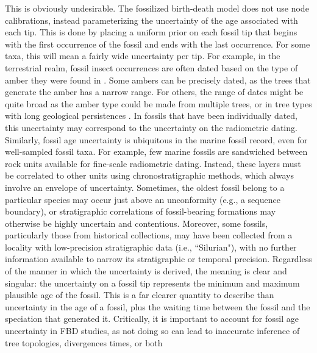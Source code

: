 \documentclass{article}
\begin{document}
This is obviously undesirable.
The fossilized birth-death model does not use node calibrations, instead parameterizing the uncertainty of the age associated with each tip.
This is done by placing a uniform prior on each fossil tip that begins with the first occurrence of the fossil and ends with the last occurrence. 
For some taxa, this will mean a fairly wide uncertainty per tip.
For example, in the terrestrial realm, fossil insect occurrences are often dated based on the type of amber they were found in \citep{lapolla2013}. Some ambers can be precisely dated, as the trees that generate the amber has a narrow range.
For others, the range of dates might be quite broad as the amber type could be made from multiple trees, or in tree types with long geological persistences \citep{poinar2000}. In fossils that have been individually dated, this uncertainty may correspond to the uncertainty on the radiometric dating. Similarly, fossil age uncertainty is ubiquitous in the marine fossil record, even for well-sampled fossil taxa. For example, few marine fossils are sandwiched between rock units available for fine-scale radiometric dating. Instead, these layers must be correlated to other units using chronostratigraphic methods, which always involve an envelope of uncertainty. Sometimes, the oldest fossil belong to a particular species may occur just above an unconformity (e.g., a sequence boundary), or stratigraphic correlations of fossil-bearing formations may otherwise be highly uncertain and contentious. Moreover, some fossils, particularly those from historical collections, may have been collected from a locality with low-precision stratigraphic data (i.e., ``Silurian"), with no further information available to narrow its stratigraphic or temporal precision. 
Regardless of the manner in which the uncertainty is derived, the meaning is clear and singular: the uncertainty on a fossil tip represents the minimum and maximum plausible age of the fossil.
This is a far clearer quantity to describe than uncertainty in the age of a fossil, plus the waiting time between the fossil and the speciation that generated it. Critically, it is important to account for fossil age uncertainty in FBD studies, as not doing so can lead to inaccurate inference of tree topologies, divergences times, or both \citep{BaridoSottani2019a,BaridoSottaniEtAl2020}
\end{document}
